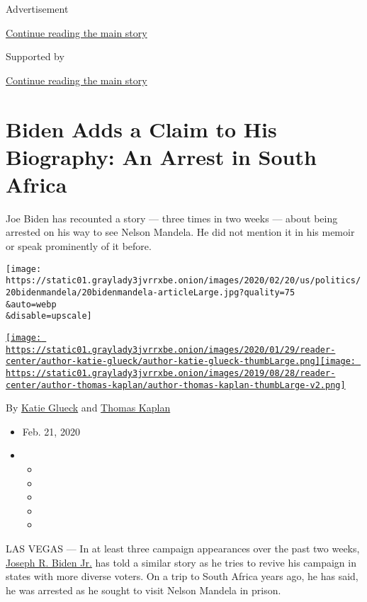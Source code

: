 Advertisement

\protect\hyperlink{after-top}{Continue reading the main story}

Supported by

\protect\hyperlink{after-sponsor}{Continue reading the main story}

\hypertarget{biden-adds-a-claim-to-his-biography-an-arrest-in-south-africa}{%
\section{Biden Adds a Claim to His Biography: An Arrest in South
Africa}\label{biden-adds-a-claim-to-his-biography-an-arrest-in-south-africa}}

Joe Biden has recounted a story --- three times in two weeks --- about
being arrested on his way to see Nelson Mandela. He did not mention it
in his memoir or speak prominently of it before.

\texttt{[image: https://static01.graylady3jvrrxbe.onion/images/2020/02/20/us/politics/20bidenmandela/20bidenmandela-articleLarge.jpg?quality=75\\\&auto=webp\\\&disable=upscale]}

\href{https://www.nytimes3xbfgragh.onion/by/katie-glueck}{\texttt{[image: https://static01.graylady3jvrrxbe.onion/images/2020/01/29/reader-center/author-katie-glueck/author-katie-glueck-thumbLarge.png]}}\href{https://www.nytimes3xbfgragh.onion/by/thomas-kaplan}{\texttt{[image: https://static01.graylady3jvrrxbe.onion/images/2019/08/28/reader-center/author-thomas-kaplan/author-thomas-kaplan-thumbLarge-v2.png]}}

By \href{https://www.nytimes3xbfgragh.onion/by/katie-glueck}{Katie
Glueck} and
\href{https://www.nytimes3xbfgragh.onion/by/thomas-kaplan}{Thomas
Kaplan}

\begin{itemize}
\item
  Feb. 21, 2020
\item
  \begin{itemize}
  \item
  \item
  \item
  \item
  \item
  \end{itemize}
\end{itemize}

LAS VEGAS --- In at least three campaign appearances over the past two
weeks,
\href{https://www.nytimes3xbfgragh.onion/interactive/2020/us/elections/joe-biden.html}{Joseph
R. Biden Jr.} has told a similar story as he tries to revive his
campaign in states with more diverse voters. On a trip to South Africa
years ago, he has said, he was arrested as he sought to visit Nelson
Mandela in prison.

